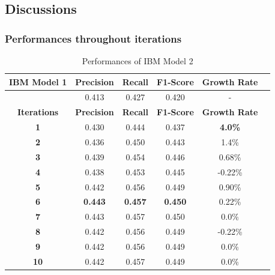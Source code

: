 
\subsection{\textbf{Discussions}}

\subsubsection{\textbf{Performances throughout iterations}}


\begin{table}[ht]  %
\centering  %
\caption{Performances of IBM Model 2}
\begin{tabular}{cccccc}
\hline
\textbf{IBM Model 1} &    \textbf{Precision} & \textbf{Recall} & \textbf{F1-Score} & \textbf{Growth Rate}  \\
\hline
  & 0.413 & 0.427 & 0.420 & - \\
 \hline
\textbf{Iterations} &    \textbf{Precision} & \textbf{Recall} & \textbf{F1-Score} & \textbf{Growth Rate}  \\
\hline
 \textbf{1} & 0.430 & 0.444 & 0.437 & \textbf{4.0\%} \\
 \hline
 \textbf{2} & 0.436 & 0.450 & 0.443 & 1.4\%\\
 \hline
 \textbf{3} & 0.439 & 0.454 & 0.446 & 0.68\%\\
 \hline
 \textbf{4} & 0.438 & 0.453 & 0.445 & -0.22\%\\
\hline
 \textbf{5} & 0.442 & 0.456 & 0.449 & 0.90\%\\
 \hline
 \textbf{6} & \textbf{0.443} & \textbf{0.457} & \textbf{0.450} & 0.22\%\\
 \hline
 \textbf{7} & 0.443 & 0.457 & 0.450 & 0.0\%\\
 \hline
 \textbf{8} & 0.442 & 0.456 & 0.449 & -0.22\%\\
 \hline
 \textbf{9} & 0.442 & 0.456 & 0.449 & 0.0\%\\
 \hline
 \textbf{10} & 0.442 & 0.457 & 0.449 & 0.0\%\\
\hline
\end{tabular}
\label{tab:ibm2iter}
\end{table}

